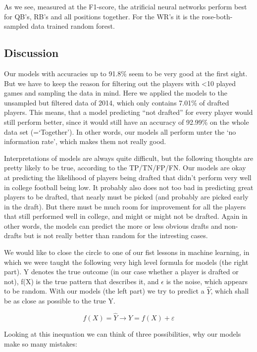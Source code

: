 \documentclass[]{article}
\begin{document}
As we see, measured at the F1-score, the atrificial neural networks
perform best for QB's, RB's and all positions together. For the WR's it
is the rose-both-sampled data trained random forest.

\hypertarget{discussion}{%
\subsection{Discussion}\label{discussion}}

Our models with accuracies up to 91.8\% seem to be very good at the
first sight. But we have to keep the reason for filtering out the
players with \textless10 played games and sampling the data in mind.
Here we applied the models to the unsampled but filtered data of 2014,
which only contains 7.01\% of drafted players. This means, that a model
predicting ``not drafted'' for every player would still perform better,
since it would still have an accuracy of 92.99\% on the whole data set
(=`Together'). In other words, our models all perform unter the `no
information rate', which makes them not really good.

Interpretations of models are always quite difficult, but the following
thoughts are pretty likely to be true, according to the TP/TN/FP/FN. Our
models are okay at predicting the likelihood of players being drafted
that didn't perform very well in college football being low. It probably
also does not too bad in predicting great players to be drafted, that
nearly must be picked (and probably are picked early in the draft). But
there must be much room for improvement for all the players that still
performed well in college, and might or might not be drafted. Again in
other words, the models can predict the more or less obvious drafts and
non-drafts but is not really better than random for the intresting
cases.

We would like to close the circle to one of our fist lessons in machine
learning, in which we were taught the following very high level formula
for models (the right part). Y denotes the true outcome (in our case
whether a player is drafted or not), f(X) is the true pattern that
describes it, and \(\epsilon\) is the noise, which appears to be random.
With our models (the left part) we try to predict a \(\hat{Y}\), which
shall be as close as possible to the true Y.

\[\hat{f}(X) = \hat{Y} \longrightarrow Y = f(X) + \varepsilon\]

Looking at this inequation we can think of three possibilities, why our
models make so many mistakes:
\end{document}
